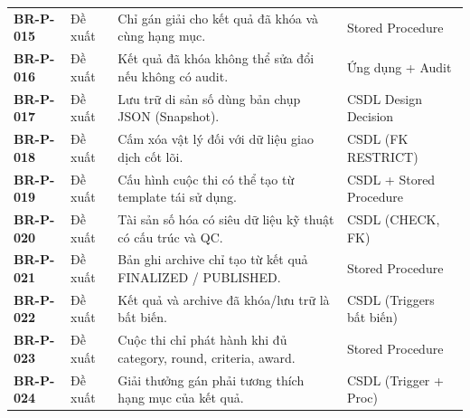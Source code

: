 \begin{table}[!ht]
\begin{tabularx}{\textwidth}{p{1.8cm}p{1.6cm}>{\raggedright\arraybackslash}Xp{3.4cm}}
\textbf{BR-P-015} & Đề xuất & Chỉ gán giải cho kết quả đã khóa và cùng hạng mục. & Stored Procedure \\
\textbf{BR-P-016} & Đề xuất & Kết quả đã khóa không thể sửa đổi nếu không có audit. & Ứng dụng + Audit \\
\textbf{BR-P-017} & Đề xuất & Lưu trữ di sản số dùng bản chụp JSON (Snapshot). & CSDL Design Decision \\
\textbf{BR-P-018} & Đề xuất & Cấm xóa vật lý đối với dữ liệu giao dịch cốt lõi. & CSDL (FK RESTRICT) \\
\textbf{BR-P-019} & Đề xuất & Cấu hình cuộc thi có thể tạo từ template tái sử dụng. & CSDL + Stored Procedure \\
\textbf{BR-P-020} & Đề xuất & Tài sản số hóa có siêu dữ liệu kỹ thuật có cấu trúc và QC. & CSDL (CHECK, FK) \\
\textbf{BR-P-021} & Đề xuất & Bản ghi archive chỉ tạo từ kết quả FINALIZED / PUBLISHED. & Stored Procedure \\
\textbf{BR-P-022} & Đề xuất & Kết quả và archive đã khóa/lưu trữ là bất biến. & CSDL (Triggers bất biến) \\
\textbf{BR-P-023} & Đề xuất & Cuộc thi chỉ phát hành khi đủ category, round, criteria, award. & Stored Procedure \\
\textbf{BR-P-024} & Đề xuất & Giải thưởng gán phải tương thích hạng mục của kết quả. & CSDL (Trigger + Proc) \\
\bottomrule
\end{tabularx}
\end{table}

